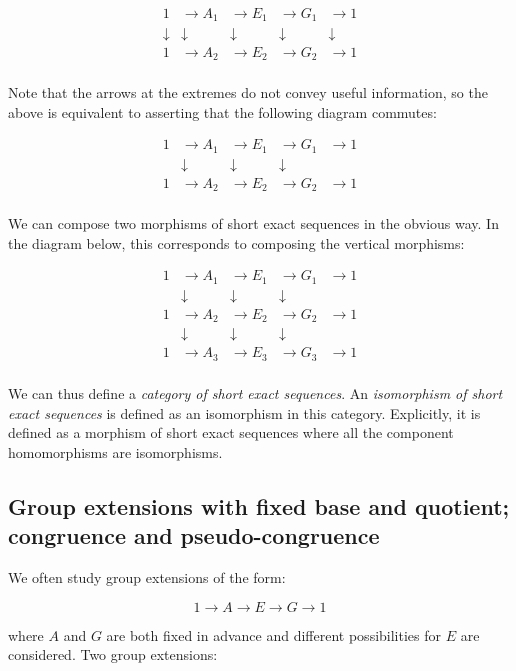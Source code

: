 $$\begin{array}{rrrrr}
  1 & \to A_1 & \to E_1 & \to G_1 & \to 1 \\
  \downarrow & \downarrow & \downarrow & \downarrow & \downarrow\\
  1 & \to A_2 & \to E_2 & \to G_2 & \to 1 \\
\end{array}$$

Note that the arrows at the extremes do not convey useful information,
so the above is equivalent to asserting that the following diagram
commutes:

$$\begin{array}{rrrrr}
  1 & \to A_1 & \to E_1 & \to G_1 & \to 1 \\
  & \downarrow & \downarrow & \downarrow &\\
  1 & \to A_2 & \to E_2 & \to G_2 & \to 1 \\
\end{array}$$

We can compose two morphisms of short exact sequences in the obvious
way. In the diagram below, this corresponds to composing the vertical
morphisms:

$$\begin{array}{rrrrr}
  1 & \to A_1 & \to E_1 & \to G_1 & \to 1 \\
  & \downarrow & \downarrow & \downarrow & \\
  1 & \to A_2 & \to E_2 & \to G_2 & \to 1 \\
  & \downarrow & \downarrow & \downarrow & \\
  1 & \to A_3 & \to E_3 & \to G_3 & \to 1 \\
\end{array}$$

We can thus define a {\em category of short exact sequences}. An
{\em isomorphism of short exact sequences} is defined as an
isomorphism in this category. Explicitly, it is defined as a morphism
of short exact sequences where all the component homomorphisms are
isomorphisms.

\subsection{Group extensions with fixed base and quotient; congruence and pseudo-congruence}

We often study group extensions of the form:

$$1 \to A \to E \to G \to 1$$

where $A$ and $G$ are both fixed in advance and different
possibilities for $E$ are considered. Two group extensions:

